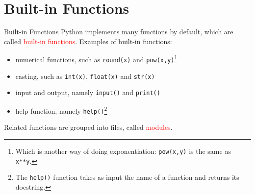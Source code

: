\documentclass[t,handout,9pt]{beamer}
\begin{document}
\section{Built-in Functions}
\begin{frame}{Built-in Functions}
\vfill
Python implements many functions by default, which are called \textcolor{red}{built-in functions}.
\vfill
Examples of built-in functions:
\begin{itemize}
	\item numerical functions, such as \texttt{round(x)} and \texttt{pow(x,y)}\footnote{Which is another way of doing exponentiation: \texttt{pow(x,y)} is the same as \texttt{x**y}.}
	\item casting, such as \texttt{int(x)}, \texttt{float(x)} and \texttt{str(x)}
	\item input and output, namely \texttt{input()} and \texttt{print()}
	\item help function, namely \texttt{help()}\footnote{The \texttt{help()} function takes as input the name of a function and returns its docstring.}
\end{itemize}
\vfill
Related functions are grouped into files, called \textcolor{red}{modules}.
\vfill
\end{frame}
%
\end{document}
